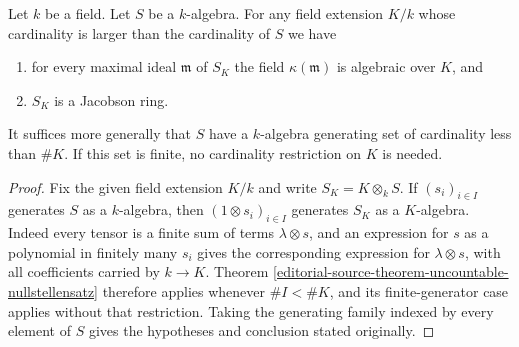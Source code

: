 \begin{lemma}
\label{editorial-source-lemma-base-change-Jacobson}
Let $k$ be a field. Let $S$ be a $k$-algebra.
For any field extension $K/k$ whose cardinality is larger
than the cardinality of $S$ we have
\begin{enumerate}
\item for every maximal ideal $\mathfrak m$ of $S_K$ the field
$\kappa(\mathfrak m)$ is algebraic over $K$, and
\item $S_K$ is a Jacobson ring.
\end{enumerate}
It suffices more generally that $S$ have a $k$-algebra generating
set of cardinality less than $\#K$. If this set is finite, no
cardinality restriction on $K$ is needed.
\end{lemma}

\begin{proof}
Fix the given field extension $K/k$ and write
$S_K=K\otimes_kS$. If $(s_i)_{i\in I}$ generates $S$ as a
$k$-algebra, then $(1\otimes s_i)_{i\in I}$ generates $S_K$ as a
$K$-algebra. Indeed every tensor is a finite sum of terms
$\lambda\otimes s$, and an expression for $s$ as a polynomial
in finitely many $s_i$ gives the corresponding expression for
$\lambda\otimes s$, with all coefficients carried by $k\to K$.
Theorem \ref{editorial-source-theorem-uncountable-nullstellensatz} therefore applies
whenever $\#I<\#K$, and its finite-generator case applies without
that restriction. Taking the generating family indexed by every
element of $S$ gives the hypotheses and conclusion stated originally.
\end{proof}